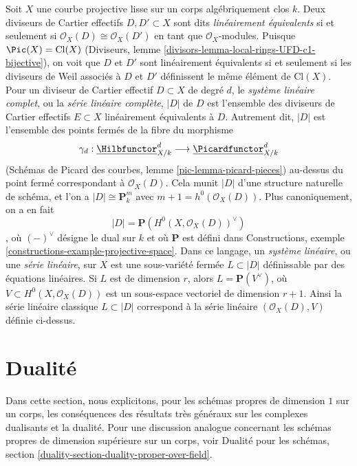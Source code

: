 \begin{remark} \label{remark-classical-linear-series} Soit $X$ une courbe projective lisse sur un corps algébriquement clos $k$. Deux diviseurs de Cartier effectifs $D, D' \subset X$ sont dits {\it linéairement équivalents} si et seulement si $\mathcal{O}_X(D) \cong \mathcal{O}_X(D')$ en tant que $\mathcal{O}_X$-modules. Puisque $\Pic(X) = \text{Cl}(X)$ (Diviseurs, lemme \ref{divisors-lemma-local-rings-UFD-c1-bijective}), on voit que $D$ et $D'$ sont linéairement équivalents si et seulement si les diviseurs de Weil associés à $D$ et $D'$ définissent le même élément de $\text{Cl}(X)$. Pour un diviseur de Cartier effectif $D \subset X$ de degré $d$, le {\it système linéaire complet}, ou la {\it série linéaire complète}, $|D|$ de $D$ est l'ensemble des diviseurs de Cartier effectifs $E \subset X$ linéairement équivalents à $D$. Autrement dit, $|D|$ est l'ensemble des points fermés de la fibre du morphisme $$
\gamma_d :
\underline{\Hilbfunctor}^d_{X/k}
\longrightarrow
\underline{\Picardfunctor}^d_{X/k}
$$ (Schémas de Picard des courbes, lemme \ref{pic-lemma-picard-pieces}) au-dessus du point fermé correspondant à $\mathcal{O}_X(D)$. Cela munit $|D|$ d'une structure naturelle de schéma, et l'on a $|D| \cong \mathbf{P}^m_k$ avec $m + 1 = h^0(\mathcal{O}_X(D))$. Plus canoniquement, on a en fait $$
|D| = \mathbf{P}(H^0(X, \mathcal{O}_X(D))^\vee)
$$, où $(-)^\vee$ désigne le dual sur $k$ et où $\mathbf{P}$ est défini dans Constructions, exemple \ref{constructions-example-projective-space}. Dans ce langage, un {\it système linéaire}, ou une {\it série linéaire}, sur $X$ est une sous-variété fermée $L \subset |D|$ définissable par des équations linéaires. Si $L$ est de dimension $r$, alors $L = \mathbf{P}(V^\vee)$, où $V \subset H^0(X, \mathcal{O}_X(D))$ est un sous-espace vectoriel de dimension $r + 1$. Ainsi la série linéaire classique $L \subset |D|$ correspond à la série linéaire $(\mathcal{O}_X(D), V)$ définie ci-dessus.
\end{remark}







\section{Dualité}
\label{section-duality}

\noindent
Dans cette section, nous explicitons, pour les schémas propres de dimension $1$ sur un corps, les conséquences des résultats très généraux sur les complexes dualisants et la dualité. Pour une discussion analogue concernant les schémas propres de dimension supérieure sur un corps, voir Dualité pour les schémas, section \ref{duality-section-duality-proper-over-field}.

